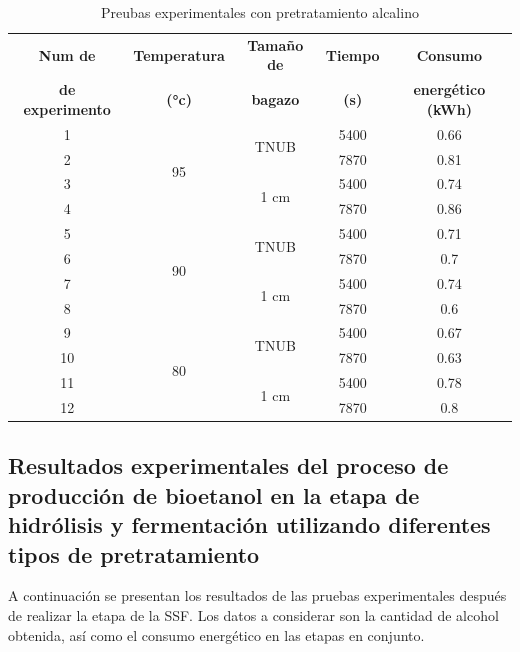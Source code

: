 \documentclass[12pt]{article}
\begin{document}
		
		\begin{table}[H]
			\centering
			\caption{Preubas experimentales con pretratamiento alcalino}
			\begin{tabular}{|c|c|c|c|c|}
				\hline
				\textbf{Num de} & \textbf{Temperatura} & \textbf{Tamaño de } & \textbf{Tiempo} & \textbf{Consumo } \\ 
			\textbf{de experimento}	&\textbf{ (°c)}&\textbf{ bagazo}  &\textbf{(s)}	&\textbf{ energético (kWh)}\\ \hline
				1 & \multirow{4}{*}{95} & \multirow{2}{*}{TNUB} & 5400 & 0.66  \\ \cline{1-1} \cline{4-5}
				2 &  &  & 7870 & 0.81  \\ \cline{3-5}  \cline{1-1} 
				3 &  & \multirow{2}{*}{1 cm} & 5400 & 0.74 \\  \cline{1-1} \cline{4-5}
				4 &  &  & 7870 & 0.86 \\ \cline{1-1}  \hline
				5 & \multirow{4}{*}{90}& \multirow{2}{*}{TNUB} & 5400 & 0.71  \\ \cline{1-1}  \cline{4-5}
				6 &  &  & 7870 & 0.7  \\ \cline{1-1} \cline{3-5}
				7 &  & \multirow{2}{*}{1 cm} & 5400 & 0.74 \\ \cline{1-1}\cline{4-5}
				8 &  &  & 7870 & 0.6 \\ \hline
				9 & \multirow{4}{*}{80} & \multirow{2}{*}{TNUB} & 5400 & 0.67  \\ \cline{1-1}\cline{4-5}
				10 &  &  & 7870 & 0.63  \\ \cline{1-1} \cline{3-5}
				11 &  &\multirow{2}{*}{1 cm} & 5400 & 0.78 \\ \cline{1-1}\cline{4-5}
				12 &  &  & 7870 & 0.8 \\ \hline
			\end{tabular}
			\label{Pretratamiento Alcalino}
		\end{table}
		
		
		
		
	
	\subsection{Resultados experimentales del proceso de producción de bioetanol en la etapa de hidrólisis y fermentación utilizando diferentes tipos de pretratamiento}
A continuación se presentan los resultados de las pruebas experimentales después de realizar la etapa de la SSF. Los datos a considerar son la cantidad de alcohol obtenida, así como el consumo energético en las etapas en conjunto.
\end{document}
